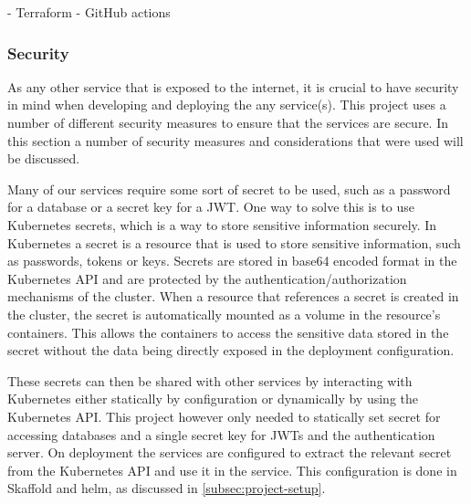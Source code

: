 \documentclass[a4paper,12pt]{article}
\begin{document}
- Terraform
- GitHub actions

\subsubsection{Security}

As any other service that is exposed to the internet, it is crucial to have security in mind when developing and deploying the any service(s).
This project uses a number of different security measures to ensure that the services are secure.
In this section a number of  security measures and considerations that were used will be discussed.

\bigskip

Many of our services require some sort of secret to be used, such as a password for a database or a secret key for a JWT.
One way to solve this is to use Kubernetes \cite{kubernetes} secrets, which is a way to store sensitive information securely.
In Kubernetes a secret is a resource that is used to store sensitive information, such as passwords, tokens or keys. 
Secrets are stored in base64 encoded format in the Kubernetes API and are protected by the authentication/authorization mechanisms of the cluster.
When a resource that references a secret is created in the cluster, the secret is automatically mounted as a volume in the resource's containers. 
This allows the containers to access the sensitive data stored in the secret without the data being directly exposed in the deployment configuration.

These secrets can then be shared with other services by interacting with Kubernetes either statically by configuration or dynamically by using the Kubernetes API. 
This project however only needed to statically set secret for accessing databases and a single secret key for JWTs and the authentication server.
On deployment the services are configured to extract the relevant secret from the Kubernetes API and use it in the service.
This configuration is done in Skaffold and helm, as discussed in \autoref{subsec:project-setup}.

\bigskip
\end{document}
